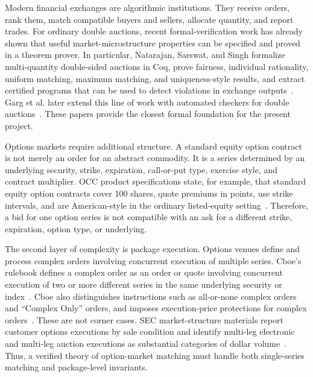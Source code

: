 \documentclass[11pt]{article}
\begin{document}
Modern financial exchanges are algorithmic institutions. They receive orders, rank them, match compatible buyers and sellers, allocate quantity, and report trades. For ordinary double auctions, recent formal-verification work has already shown that useful market-microstructure properties can be specified and proved in a theorem prover. In particular, Natarajan, Sarswat, and Singh formalize multi-quantity double-sided auctions in Coq, prove fairness, individual rationality, uniform matching, maximum matching, and uniqueness-style results, and extract certified programs that can be used to detect violations in exchange outputs~\cite{NatarajanSarswatSingh2021}. Garg et al. later extend this line of work with automated checkers for double auctions~\cite{GargRajaSarswatSingh2024}. These papers provide the closest formal foundation for the present project.

Options markets require additional structure. A standard equity option contract is not merely an order for an abstract commodity. It is a series determined by an underlying security, strike, expiration, call-or-put type, exercise style, and contract multiplier. OCC product specifications state, for example, that standard equity option contracts cover 100 shares, quote premiums in points, use strike intervals, and are American-style in the ordinary listed-equity setting~\cite{OCCEquityOptions}. Therefore, a bid for one option series is not compatible with an ask for a different strike, expiration, option type, or underlying.

The second layer of complexity is package execution. Options venues define and process complex orders involving concurrent execution of multiple series. Cboe's rulebook defines a complex order as an order or quote involving concurrent execution of two or more different series in the same underlying security or index~\cite{CboeRuleBook}. Cboe also distinguishes instructions such as all-or-none complex orders and ``Complex Only'' orders, and imposes execution-price protections for complex orders~\cite{CboeRuleBook}. These are not corner cases. SEC market-structure materials report customer options executions by sale condition and identify multi-leg electronic and multi-leg auction executions as substantial categories of dollar volume~\cite{SECOptionsRoundtable2026}. Thus, a verified theory of option-market matching must handle both single-series matching and package-level invariants.
\end{document}
